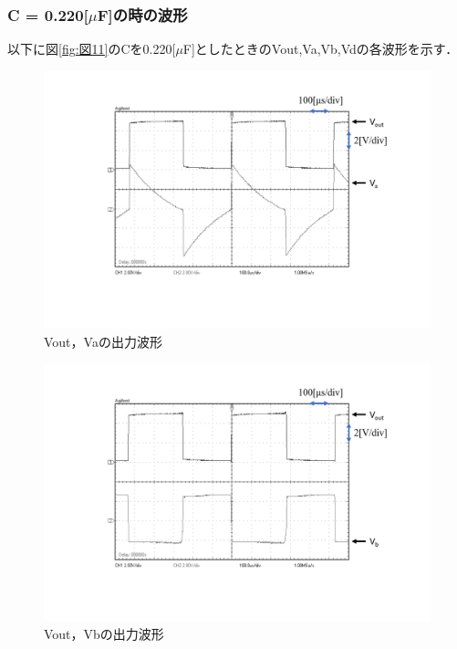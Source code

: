 \documentclass[10pt, a4j, dvipdfmx]{jarticle}
\makeatletter
\newcommand{\figcaption}[1]{\def\@captype{figure}\caption{#1}}
\makeatother
\begin{document}
\subsubsection{C = 0.220[$\mu$F]の時の波形}
以下に図\ref{fig:図11}のCを0.220[$\mu$F]としたときのVout,Va,Vb,Vdの各波形を示す．
\begin{figure}[H]
	\centering
	\includegraphics[width=\hsize]{images/224j-Vout-Va.png}
	\figcaption{Vout，Vaの出力波形}
	\label{224j-Vout-Va}
\end{figure}
\begin{figure}[H]
	\centering
	\includegraphics[width=\hsize]{images/224j-Vout-Vb.png}
	\figcaption{Vout，Vbの出力波形}
	\label{224j-Vout-Vb}
\end{figure}
\end{document}
